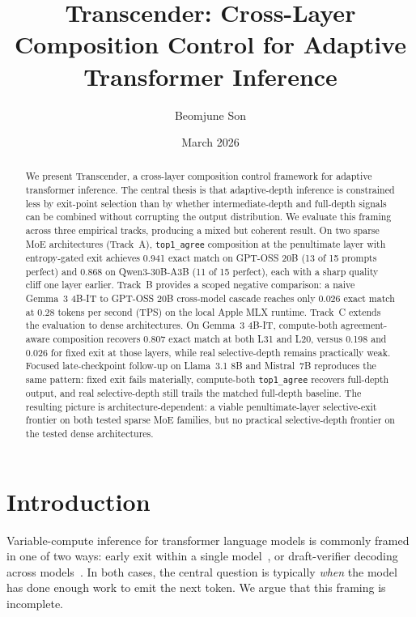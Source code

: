 \documentclass[11pt]{article}
\title{Transcender: Cross-Layer Composition Control for Adaptive Transformer Inference}
\author{Beomjune Son}
\date{March 2026}
\begin{document}
\maketitle

\begin{abstract}
We present Transcender, a cross-layer composition control framework for adaptive transformer inference. The central thesis is that adaptive-depth inference is constrained less by exit-point selection than by whether intermediate-depth and full-depth signals can be combined without corrupting the output distribution. We evaluate this framing across three empirical tracks, producing a mixed but coherent result. On two sparse MoE architectures (Track~A), \texttt{top1\_agree} composition at the penultimate layer with entropy-gated exit achieves 0.941 exact match on GPT-OSS 20B (13 of 15 prompts perfect) and 0.868 on Qwen3-30B-A3B (11 of 15 perfect), each with a sharp quality cliff one layer earlier. Track~B provides a scoped negative comparison: a naive Gemma~3 4B-IT to GPT-OSS 20B cross-model cascade reaches only 0.026 exact match at 0.28 tokens per second (TPS) on the local Apple MLX runtime. Track~C extends the evaluation to dense architectures. On Gemma~3 4B-IT, compute-both agreement-aware composition recovers 0.807 exact match at both L31 and L20, versus 0.198 and 0.026 for fixed exit at those layers, while real selective-depth remains practically weak. Focused late-checkpoint follow-up on Llama~3.1 8B and Mistral~7B reproduces the same pattern: fixed exit fails materially, compute-both \texttt{top1\_agree} recovers full-depth output, and real selective-depth still trails the matched full-depth baseline. The resulting picture is architecture-dependent: a viable penultimate-layer selective-exit frontier on both tested sparse MoE families, but no practical selective-depth frontier on the tested dense architectures.
\end{abstract}

\section{Introduction}

Variable-compute inference for transformer language models is commonly framed in one of two ways: early exit within a single model~\cite{elbayad2020depthadaptive}, or draft-verifier decoding across models~\cite{leviathan2023speculative}. In both cases, the central question is typically \emph{when} the model has done enough work to emit the next token. We argue that this framing is incomplete.
\end{document}
